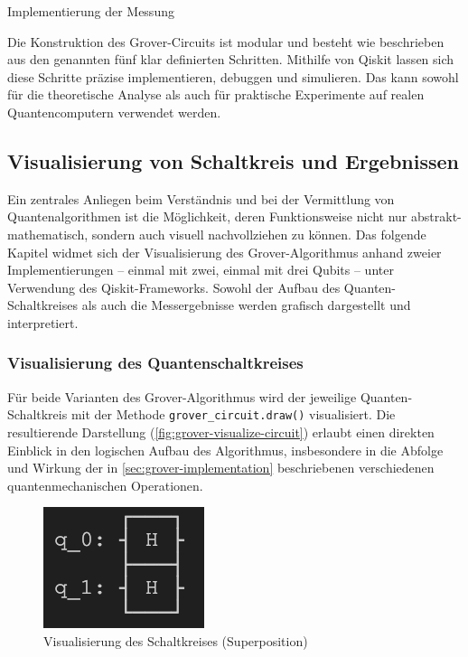 \begin{listing}[ht!]
  \inputminted{python}{code/grover-measure.py}
  \caption{Implementierung der Messung}
  \label{code:grover-measure}
\end{listing}
 
Die Konstruktion des Grover-Circuits ist modular und besteht wie beschrieben aus den genannten fünf klar definierten Schritten. Mithilfe von Qiskit lassen sich diese Schritte präzise implementieren, debuggen und simulieren. Das kann sowohl für die theoretische Analyse als auch für praktische Experimente auf realen Quantencomputern verwendet werden. \autocite{ibm_quantum_2025} \autocite{noauthor_grovers_nodate}

\subsection{Visualisierung von Schaltkreis und Ergebnissen}

Ein zentrales Anliegen beim Verständnis und bei der Vermittlung von Quantenalgorithmen ist die Möglichkeit, deren Funktionsweise nicht nur abstrakt-mathematisch, sondern auch visuell nachvollziehen zu können. Das folgende Kapitel widmet sich der Visualisierung des Grover-Algorithmus anhand zweier Implementierungen – einmal mit zwei, einmal mit drei Qubits – unter Verwendung des Qiskit-Frameworks. Sowohl der Aufbau des Quanten-Schaltkreises als auch die Messergebnisse werden grafisch dargestellt und interpretiert.

\subsubsection*{Visualisierung des Quantenschaltkreises}
\label{sec:grover-visualization}

Für beide Varianten des Grover-Algorithmus wird der jeweilige Quanten-Schaltkreis mit der Methode \texttt{grover_circuit.draw()} visualisiert. Die resultierende Darstellung (\autoref{fig:grover-visualize-circuit}) erlaubt einen direkten Einblick in den logischen Aufbau des Algorithmus, insbesondere in die Abfolge und Wirkung der in \autoref{sec:grover-implementation} beschriebenen verschiedenen quantenmechanischen Operationen.

\begin{figure}
      \includegraphics[width=0.25\linewidth]{circuit_superposition.png}
      \caption{Visualisierung des Schaltkreises (Superposition)}
      \label{fig:grover-visualize-circuit}
\end{figure}

